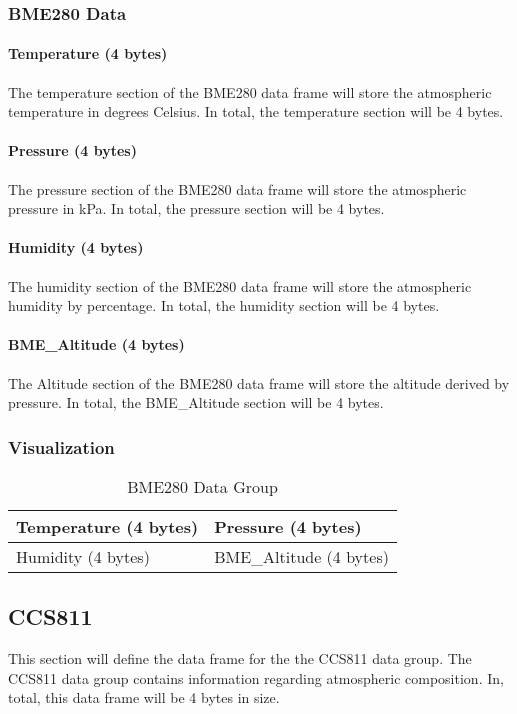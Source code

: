 \documentclass{article}
\begin{document}
  \subsubsection{BME280 Data}
  \paragraph{Temperature (4 bytes)}
  The temperature section of the BME280 data frame will store the atmospheric temperature in degrees Celsius. In total, the temperature section will be 4 bytes.
  \paragraph{Pressure (4 bytes)}
  The pressure section of the BME280 data frame will store the atmospheric pressure in kPa. In total, the pressure section will be 4 bytes.
  \paragraph{Humidity (4 bytes)}
  The humidity section of the BME280 data frame will store the atmospheric humidity by percentage. In total, the humidity section will be 4 bytes.
  \paragraph{BME\_Altitude (4 bytes)}
  The Altitude section of the BME280 data frame will store the altitude derived by pressure. In total, the BME\_Altitude section will be 4 bytes.
  \subsubsection{Visualization}
  
  \begin{table}[H]
  \centering
  \caption{BME280 Data Group}
  \label{my-label}
  \begin{tabular}{|l|l|}
  \hline
Temperature (4 bytes) & Pressure (4 bytes)      \\ \hline
Humidity (4 bytes)    & BME\_Altitude (4 bytes) \\ \hline
  \end{tabular}
  \end{table}
  
  \subsection{CCS811}
  This section will define the data frame for the the CCS811 data group. The CCS811 data group contains information regarding atmospheric composition. In,      total, this data frame will be 4 bytes in size.
\end{document}
